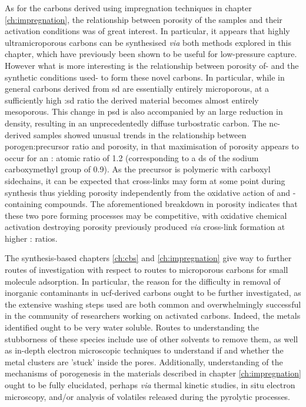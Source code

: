 As for the carbons derived using impregnation techniques in chapter \ref{ch:impregnation}, the relationship between porosity of the samples and their activation conditions was of great interest. In particular, it appears that highly ultramicroporous carbons can be synthesised \textit{via} both methods explored in this chapter, which have previously been shown to be useful for low-pressure  capture. However what is more interesting is the relationship between porosity of- and the synthetic conditions used- to form these novel carbons. In particular, while in general carbons derived from \acrshort{sd} are essentially entirely microporous, at a sufficiently high :\acrshort{sd} ratio the derived material becomes almost entirely mesoporous. This change in \acrshort{psd} is also accompanied by an large reduction in density, resulting in an unprecedentedly diffuse \gls{turbostratic carbon}. The \acrshort{nc}-derived samples showed unusual trends in the relationship between \gls{porogen}:precursor ratio and porosity, in that maximisation of porosity appears to occur for an : atomic ratio of 1.2 (corresponding to a \acrfull{ds} of the sodium carboxymethyl group of 0.9). As the precursor is polymeric with carboxyl sidechains, it can be expected that cross-links may form at some point during synthesis thus yielding porosity independently from the oxidative action of  and -containing compounds. The aforementioned breakdown in porosity indicates that these two pore forming processes may be competitive, with oxidative chemical activation destroying porosity previously produced \textit{via} cross-link formation at higher : ratios.

The synthesis-based chapters \ref{ch:cbs} and \ref{ch:impregnation} give way to further routes of investigation with respect to routes to microporous carbons for small molecule adsorption. In particular, the reason for the difficulty in removal of inorganic contaminants in \gls{ucf}-derived carbons ought to be further investigated, as the extensive washing steps used are both common and overwhelmingly successful in the community of researchers working on \glspl{activated carbon}. Indeed, the metals identified ought to be very water soluble. Routes to understanding the stubborness of these species include use of other solvents to remove them, as well as in-depth electron microscopic techniques to understand if and whether the metal clusters are 'stuck' inside the pores. Additionally, understanding of the mechanisms of porogenesis in the materials described in chapter \ref{ch:impregnation} ought to be fully elucidated, perhaps \textit{via} thermal kinetic studies, in situ electron microscopy, and/or analysis of volatiles released during the pyrolytic processes. 


